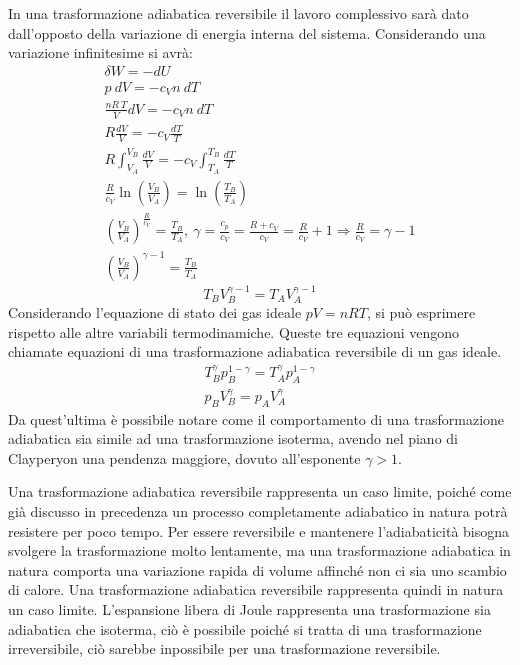 \documentclass{article}
\numberwithin{equation}{subsection}
\begin{document}
In una trasformazione adiabatica reversibile il lavoro complessivo 
sarà dato dall'opposto della variazione di energia interna del sistema. 
Considerando una variazione infinitesime si avrà:
\begin{gather*}
    \delta W=-dU\\
    p\:dV=-c_Vn\:dT\\
    \displaystyle\frac{nR\:T}{V}dV=-c_Vn\:dT\\
    \displaystyle R\frac{dV}{V}=-c_V\frac{dT}{T}\\
    \displaystyle R\int_{V_A}^{V_B}\frac{dV}{V}=-c_V\int_{T_A}^{T_B}\frac{dT}{T}\\
    \displaystyle\frac{R}{c_V}\ln\left(\frac{V_B}{V_A}\right)=\ln\left(\frac{T_B}{T_A}\right)\\
    \displaystyle\left(\frac{V_B}{V_A}\right)^{\frac{R}{c_V}}=\frac{T_B}{T_A},\:\gamma=\frac{c_p}{c_V}=\frac{R+c_V}{c_V}=\frac{R}{c_V}+1\Rightarrow\frac{R}{c_V}=\gamma-1\\
    \displaystyle\left(\frac{V_B}{V_A}\right)^{\gamma-1}=\frac{T_B}{T_A}
\end{gather*}
\begin{equation}
    T_BV_B^{\gamma-1}=T_AV_A^{\gamma-1}
\end{equation}
Considerando l'equazione di stato dei gas ideale $pV=nRT$, si può esprimere rispetto alle altre variabili termodinamiche. Queste tre equazioni vengono chiamate equazioni 
di una trasformazione adiabatica reversibile di un gas ideale.  
\begin{gather}
    T_B^{\gamma}p_B^{1-\gamma}=T_A^{\gamma}p_A^{1-\gamma}\\
    p_BV_B^{\gamma}=p_AV_A^{\gamma}
\end{gather}
Da quest'ultima è possibile notare come il comportamento di una 
trasformazione adiabatica sia simile ad una trasformazione 
isoterma, avendo nel piano di Clayperyon una pendenza 
maggiore, dovuto all'esponente $\gamma>1$. 


Una trasformazione adiabatica reversibile rappresenta un caso limite, poiché come già discusso in precedenza un processo completamente adiabatico in natura potrà resistere 
per poco tempo. Per essere reversibile e mantenere l'adiabaticità bisogna svolgere la trasformazione molto lentamente, ma una trasformazione adiabatica in natura comporta una variazione rapida di 
volume affinché non ci sia uno scambio di calore. Una trasformazione adiabatica reversibile rappresenta quindi in natura un caso limite. L'espansione libera di Joule rappresenta 
una trasformazione sia adiabatica che isoterma, ciò è possibile poiché si tratta di una trasformazione irreversibile, ciò sarebbe inpossibile per una trasformazione reversibile. 
\end{document}
